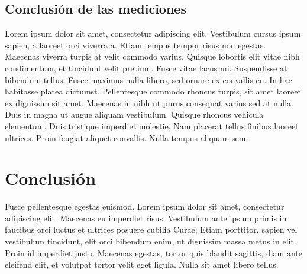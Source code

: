 \documentclass[final,inline,a4paper,narroweqnarray]{ieee}
\begin{document}

  \subsection{Conclusión de las mediciones}

Lorem ipsum dolor sit amet, consectetur adipiscing elit. Vestibulum cursus ipsum sapien, a laoreet orci viverra a. Etiam tempus tempor risus non egestas. Maecenas viverra turpis at velit commodo varius. Quisque lobortis elit vitae nibh condimentum, et tincidunt velit pretium. Fusce vitae lacus mi. Suspendisse at bibendum tellus. Fusce maximus nulla libero, sed ornare ex convallis eu. In hac habitasse platea dictumst. Pellentesque commodo rhoncus turpis, sit amet laoreet ex dignissim sit amet. Maecenas in nibh ut purus consequat varius sed at nulla. Duis in magna ut augue aliquam vestibulum. Quisque rhoncus vehicula elementum. Duis tristique imperdiet molestie. Nam placerat tellus finibus laoreet ultrices. Proin feugiat aliquet convallis. Nulla tempus aliquam sem.

\section{Conclusión}

Fusce pellentesque egestas euismod. Lorem ipsum dolor sit amet, consectetur adipiscing elit. Maecenas eu imperdiet risus. Vestibulum ante ipsum primis in faucibus orci luctus et ultrices posuere cubilia Curae; Etiam porttitor, sapien vel vestibulum tincidunt, elit orci bibendum enim, ut dignissim massa metus in elit. Proin id imperdiet justo. Maecenas egestas, tortor quis blandit sagittis, diam ante eleifend elit, et volutpat tortor velit eget ligula. Nulla sit amet libero tellus.
\end{document}
